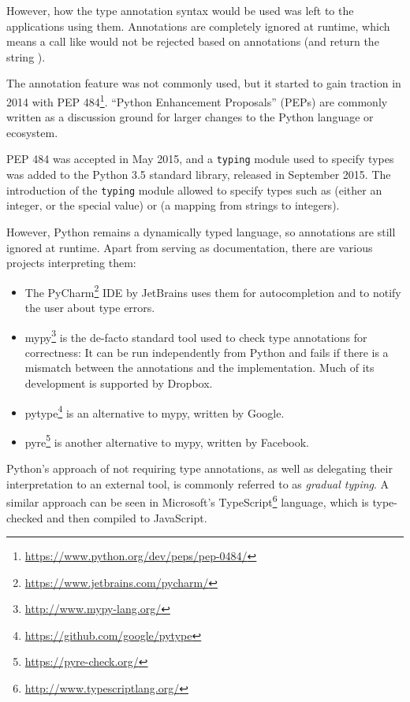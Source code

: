 However, how the type annotation syntax would be used was left to the
applications using them. Annotations are completely ignored at runtime, which
means a call like  would not be rejected based on annotations
(and return the string ).

The annotation feature was not commonly used, but it started to gain traction
in 2014 with PEP 484\footnote{\url{https://www.python.org/dev/peps/pep-0484/}}.
``Python Enhancement Proposals'' (PEPs) are commonly written as a discussion
ground for larger changes to the Python language or ecosystem.

PEP 484 was accepted in May 2015, and a \verb|typing| module used to specify types
was added to the Python 3.5 standard library, released in September 2015. The
introduction of the \verb|typing| module allowed to specify types such as
 (either an integer, or the special  value) or
 (a mapping from strings to integers).

However, Python remains a dynamically typed language, so annotations are
still ignored at runtime. Apart from serving as documentation, there are various
projects interpreting them:

\label{typecheck-tools}
\begin{itemize}
  \item The PyCharm\footnote{\url{https://www.jetbrains.com/pycharm/}} IDE by
    JetBrains uses them for autocompletion and to notify the user about type
    errors.
  \item mypy\footnote{\url{http://www.mypy-lang.org/}} is the de-facto standard
    tool used to check type annotations for correctness: It can be run
    independently from Python and fails if there is a mismatch between the
    annotations and the implementation. Much of its development is supported by
    Dropbox.
  \item pytype\footnote{\url{https://github.com/google/pytype}} is an
    alternative to mypy, written by Google.
  \item pyre\footnote{\url{https://pyre-check.org/}} is another alternative
    to mypy, written by Facebook.
\end{itemize}

Python's approach of not requiring type annotations, as well as delegating their
interpretation to an external tool, is commonly referred to as
\emph{gradual typing}. A similar approach can be seen in Microsoft's
TypeScript\footnote{\url{http://www.typescriptlang.org/}} language, which is
type-checked and then compiled to JavaScript.

